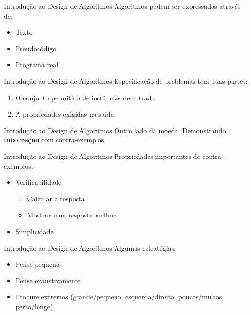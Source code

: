 \documentclass[10pt]{beamer}
\begin{document}
\begin{frame}{Introdução ao Design de Algoritmos}
    \Large
    Algoritmos podem ser expressados através de:
    
    \begin{itemize}
        \item \Large Texto
        \item \Large Pseudocódigo
        \item \Large Programa real
    \end{itemize}
    
\end{frame}

\begin{frame}{Introdução ao Design de Algoritmos}
    \Large
    Especificação de problemas tem duas partes:
    
    \begin{enumerate}
        \item \Large O conjunto permitido de instâncias de entrada
        \item \Large A propriedades exigidas na saída
    \end{enumerate}
\end{frame}

\begin{frame}{Introdução ao Design de Algoritmos}
    \huge
    Outro lado da moeda: Demonstrando \textbf{incorreção} com contra-exemplos
\end{frame}

\begin{frame}{Introdução ao Design de Algoritmos}
    \Large Propriedades importantes de contra-exemplos:
    
    \begin{itemize}
        \item \Large Verificabilidade
        \begin{itemize}
            \Large
            \item Calcular a resposta
            \item Mostrar uma resposta melhor
        \end{itemize}
        \item \Large Simplicidade
    \end{itemize}
\end{frame}

\begin{frame}{Introdução ao Design de Algoritmos}
    \Large Algumas estratégias:
    
    \begin{itemize}
        \Large
        \item Pense pequeno
        \item Pense exaustivamente
        \item Procure extremos (grande/pequeno, esquerda/direita, poucos/muitos, perto/longe)
    \end{itemize}
\end{frame}
\end{document}
